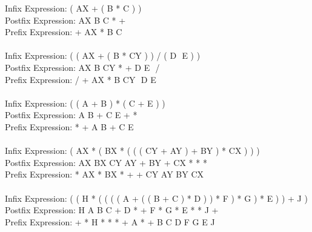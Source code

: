 \documentclass{article}
\begin{document}
\begin{enumerate}
Infix Expression: ( AX + ( B * C ) ) 
\\
Postfix Expression: AX B C * +
\\
Prefix Expression: + AX * B C
\\
\\
Infix Expression: ( ( AX + ( B * CY ) ) / ( D ­ E ) ) 
\\
Postfix Expression: AX B CY * + D E ­ /
\\
Prefix Expression: / + AX * B CY ­ D E
\\
\\
Infix Expression: ( ( A + B ) * ( C + E ) ) 
\\
Postfix Expression: A B + C E + *
\\
Prefix Expression: * + A B + C E
\\
\\
Infix Expression: ( AX * ( BX * ( ( ( CY + AY ) + BY ) * CX ) ) ) 
\\
Postfix Expression: AX BX CY AY + BY + CX * * *
\\
Prefix Expression: * AX * BX * + + CY AY BY CX
\\
\\
Infix Expression: ( ( H * ( ( ( ( A + ( ( B + C ) * D ) ) * F ) * G ) * E ) ) + J ) 
\\
Postfix Expression: H A B C + D * + F * G * E * * J +
\\
Prefix Expression: + * H * * * + A * + B C D F G E J

\end{enumerate}
\enddocument
\end{document}
